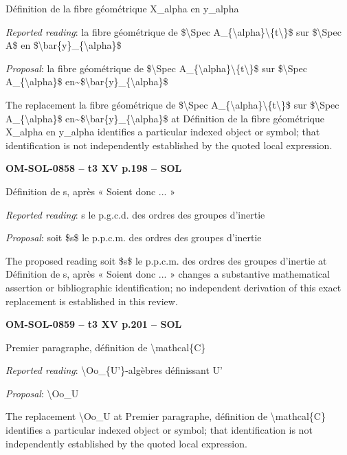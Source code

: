 Définition de la fibre géométrique X\_alpha en y\_alpha\par
\emph{Reported reading}: la fibre géométrique de \$\textbackslash{}Spec A\_\{\textbackslash{}alpha\}\textbackslash{}\{t\textbackslash{}\}\$ sur \$\textbackslash{}Spec A\$ en \$\textbackslash{}bar\{y\}\_\{\textbackslash{}alpha\}\$\par
\emph{Proposal}: la fibre géométrique de \$\textbackslash{}Spec A\_\{\textbackslash{}alpha\}\textbackslash{}\{t\textbackslash{}\}\$ sur \$\textbackslash{}Spec A\_\{\textbackslash{}alpha\}\$ en\textasciitilde{}\$\textbackslash{}bar\{y\}\_\{\textbackslash{}alpha\}\$\par
The replacement la fibre géométrique de \$\textbackslash{}Spec A\_\{\textbackslash{}alpha\}\textbackslash{}\{t\textbackslash{}\}\$ sur \$\textbackslash{}Spec A\_\{\textbackslash{}alpha\}\$ en\textasciitilde{}\$\textbackslash{}bar\{y\}\_\{\textbackslash{}alpha\}\$ at Définition de la fibre géométrique X\_alpha en y\_alpha identifies a particular indexed object or symbol; that identification is not independently established by the quoted local expression.\par
\par\noindent\textbf{OM-SOL-0858 -- t3 XV p.198 -- SOL}\par
Définition de s, après « Soient donc ... »\par
\emph{Reported reading}: s le p.g.c.d. des ordres des groupes d'inertie\par
\emph{Proposal}: soit \$s\$ le p.p.c.m. des ordres des groupes d'inertie\par
The proposed reading soit \$s\$ le p.p.c.m. des ordres des groupes d'inertie at Définition de s, après « Soient donc ... » changes a substantive mathematical assertion or bibliographic identification; no independent derivation of this exact replacement is established in this review.\par
\par\noindent\textbf{OM-SOL-0859 -- t3 XV p.201 -- SOL}\par
Premier paragraphe, définition de \textbackslash{}mathcal\{C\}\par
\emph{Reported reading}: \textbackslash{}Oo\_\{U'\}-algèbres définissant U'\par
\emph{Proposal}: \textbackslash{}Oo\_U\par
The replacement \textbackslash{}Oo\_U at Premier paragraphe, définition de \textbackslash{}mathcal\{C\} identifies a particular indexed object or symbol; that identification is not independently established by the quoted local expression.\par
